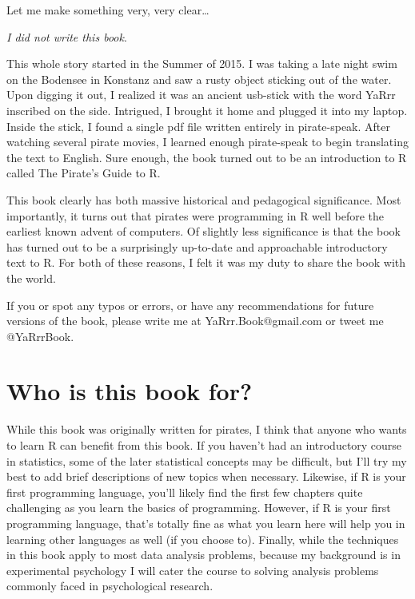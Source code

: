 \documentclass[]{book}
\theoremstyle{definition}
\theoremstyle{definition}
\theoremstyle{remark}
\begin{document}
Let me make something very, very clear\ldots{}

\emph{I did not write this book}.

This whole story started in the Summer of 2015. I was taking a late
night swim on the Bodensee in Konstanz and saw a rusty object sticking
out of the water. Upon digging it out, I realized it was an ancient
usb-stick with the word YaRrr inscribed on the side. Intrigued, I
brought it home and plugged it into my laptop. Inside the stick, I found
a single pdf file written entirely in pirate-speak. After watching
several pirate movies, I learned enough pirate-speak to begin
translating the text to English. Sure enough, the book turned out to be
an introduction to R called The Pirate's Guide to R.

This book clearly has both massive historical and pedagogical
significance. Most importantly, it turns out that pirates were
programming in R well before the earliest known advent of computers. Of
slightly less significance is that the book has turned out to be a
surprisingly up-to-date and approachable introductory text to R. For
both of these reasons, I felt it was my duty to share the book with the
world.

If you or spot any typos or errors, or have any recommendations for
future versions of the book, please write me at YaRrr.Book@gmail.com or
tweet me @YaRrrBook.

\section{Who is this book for?}\label{who-is-this-book-for}

While this book was originally written for pirates, I think that anyone
who wants to learn R can benefit from this book. If you haven't had an
introductory course in statistics, some of the later statistical
concepts may be difficult, but I'll try my best to add brief
descriptions of new topics when necessary. Likewise, if R is your first
programming language, you'll likely find the first few chapters quite
challenging as you learn the basics of programming. However, if R is
your first programming language, that's totally fine as what you learn
here will help you in learning other languages as well (if you choose
to). Finally, while the techniques in this book apply to most data
analysis problems, because my background is in experimental psychology I
will cater the course to solving analysis problems commonly faced in
psychological research.
\end{document}
